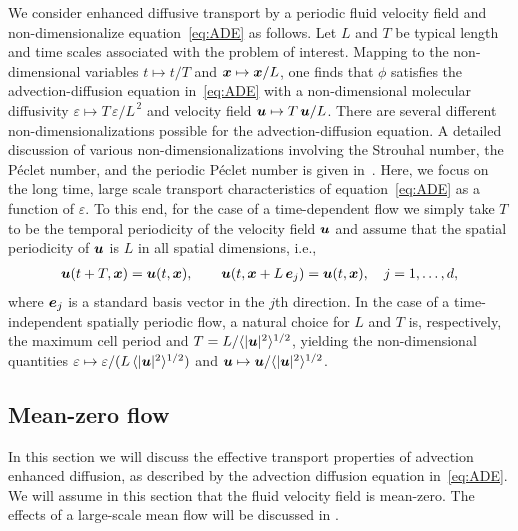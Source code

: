 \documentclass[amsa]{ipart}
\begin{document}
We consider enhanced diffusive transport by a periodic fluid velocity
field and non-dimensionalize equation~\eqref{eq:ADE} as follows. Let
$L$ and $T$ be typical length and time scales associated with the
problem of interest. Mapping to the non-dimensional variables
$t\mapsto t/T$ and $\boldsymbol{x}\mapsto \boldsymbol{x}/L$,
one finds that $\phi$ satisfies the advection-diffusion equation
in~\eqref{eq:ADE} with a non-dimensional molecular diffusivity 
$\varepsilon\mapsto T\,\varepsilon/L^{\,2}$ and velocity field $\boldsymbol{u}\mapsto T\,\boldsymbol{u} /L$. There are
several different non-dimensionalizations possible 
for the advection-diffusion equation. A detailed discussion of 
various non-dimensionalizations involving the Strouhal number, the
P{\'e}clet number, and the periodic P{\'e}clet number is given
in~\cite{McLaughlin:Forest:PF:1999:880,Majda:Kramer:1999:book}.  Here,
we focus on the long time, large scale transport characteristics of
equation~\eqref{eq:ADE} as a function of $\varepsilon$. To this end, for the
case of a time-dependent flow we simply
take $T$ to be the temporal periodicity of the velocity field $\boldsymbol{u}$
and assume that the spatial periodicity of $\boldsymbol{u}$ is $L$ in all
spatial dimensions, i.e., 
%
\begin{align}\label{eq:Periodic_u}
  \vecu(t+T,\vecx)=\vecu(t,\vecx), \qquad
  \vecu(t,\vecx+L\,\vece_j)=\vecu(t,\vecx), \quad
  j=1,\ldots,d,
\end{align}
%
where $\boldsymbol{e}_j$ is a standard basis vector in the $j$th direction. 
In the case of a time-independent spatially periodic flow, a natural
choice for $L$ and $T$ is, respectively, the maximum cell period and
$T=L/\langle|\boldsymbol{u}|^2\rangle^{1/2}$, yielding the non-dimensional quantities
$\varepsilon\mapsto\varepsilon/(L\,\langle|\boldsymbol{u}|^2\rangle^{1/2})$ and $\boldsymbol{u}\mapsto\boldsymbol{u}/\langle|\boldsymbol{u}|^2\rangle^{1/2}$.  


\subsection{Mean-zero flow}\label{sec:Mean_zero_flow}
%
In this section we will discuss the effective transport properties of
advection enhanced diffusion, as described by the advection diffusion
equation in~\eqref{eq:ADE}. We will assume in this section that the
fluid velocity field is mean-zero. The effects of a large-scale mean
flow will be discussed in . 
\end{document}
